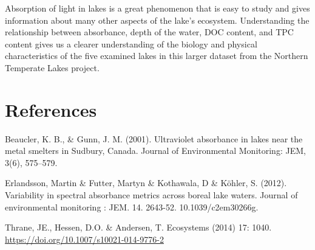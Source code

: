 \documentclass[12pt,]{article}
\begin{document}
Absorption of light in lakes is a great phenomenon that is easy to study
and gives information about many other aspects of the lake's ecosystem.
Understanding the relationship between absorbance, depth of the water,
DOC content, and TPC content gives us a clearer understanding of the
biology and physical characteristics of the five examined lakes in this
larger dataset from the Northern Temperate Lakes project.

\newpage

\section{References}\label{references}

Beaucler, K. B., \& Gunn, J. M. (2001). Ultraviolet absorbance in lakes
near the metal smelters in Sudbury, Canada. Journal of Environmental
Monitoring: JEM, 3(6), 575--579.

Erlandsson, Martin \& Futter, Martyn \& Kothawala, D \& Köhler, S.
(2012). Variability in spectral absorbance metrics across boreal lake
waters. Journal of environmental monitoring : JEM. 14. 2643-52.
10.1039/c2em30266g.

Thrane, JE., Hessen, D.O. \& Andersen, T. Ecosystems (2014) 17: 1040.
\url{https://doi.org/10.1007/s10021-014-9776-2}
\end{document}
